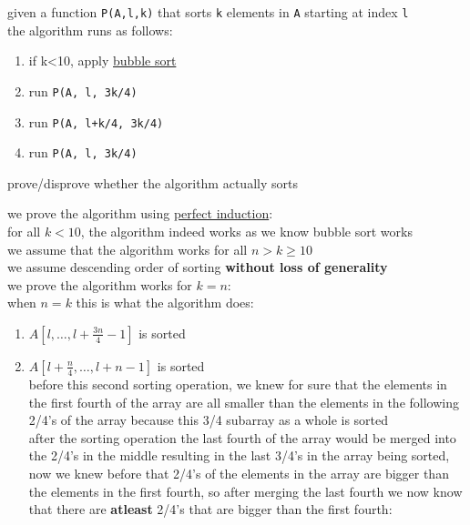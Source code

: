 \documentclass[a4paper,12pt]{article}
\begin{document}
\begin{question}
given a function \texttt{P(A,l,k)} that sorts \texttt{k} elements in \texttt{A} starting at index \texttt{l}\\
the algorithm runs as follows:\\
\begin{enumerate}
\item if k<10, apply \href{20221105005344-sorting_algorithm.org}{bubble sort}\\
\item run \texttt{P(A, l, 3k/4)}\\
\item run \texttt{P(A, l+k/4, 3k/4)}\\
\item run \texttt{P(A, l, 3k/4)}\\
\end{enumerate}
\begin{subquestion}
prove/disprove whether the algorithm actually sorts\\
\begin{answer}
we prove the algorithm using \href{20220707193301-mathematical_induction.org}{perfect induction}:\\
for all \(k < 10\), the algorithm indeed works as we know bubble sort works\\
we assume that the algorithm works for all \(n > k \ge 10\)\\
we assume descending order of sorting \textbf{without loss of generality}\\
we prove the algorithm works for \(k=n\):\\
when \(n=k\) this is what the algorithm does:\\
\begin{enumerate}
\item \(A\left[l,\dots,l+\frac{3n}{4}-1\right]\) is sorted\\
\item \(A\left[l+\frac{n}{4},\dots,l+n-1\right]\) is sorted\\
before this second sorting operation, we knew for sure that the elements in the first fourth of the array are all smaller than the elements in the following 2/4's of the array because this 3/4 subarray as a whole is sorted\\
after the sorting operation the last fourth of the array would be merged into the 2/4's in the middle resulting in the last 3/4's in the array being sorted, now we knew before that 2/4's of the elements in the array are bigger than the elements in the first fourth, so after merging the last fourth we now know that there are \textbf{atleast} 2/4's that are bigger than the first fourth:\\

\end{enumerate}
\end{answer}
\end{subquestion}
\end{question}
\end{document}
